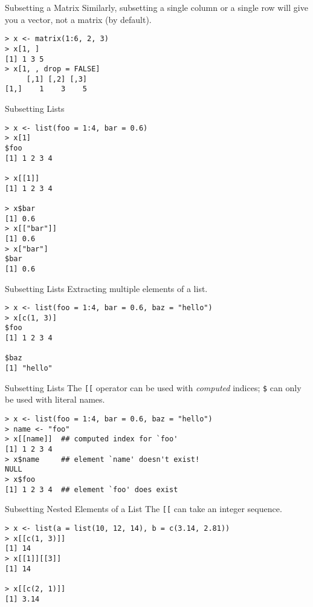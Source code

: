 \documentclass[aspectratio=169]{beamer}
\begin{document}
\begin{frame}[fragile]{Subsetting a Matrix}
Similarly, subsetting a single column or a single row will give you a
vector, not a matrix (by default).
\begin{verbatim}
> x <- matrix(1:6, 2, 3)
> x[1, ]
[1] 1 3 5
> x[1, , drop = FALSE]
     [,1] [,2] [,3]
[1,]    1    3    5
\end{verbatim}
\end{frame}

\begin{frame}[fragile]{Subsetting Lists}
\begin{verbatim}
> x <- list(foo = 1:4, bar = 0.6)
> x[1]
$foo
[1] 1 2 3 4

> x[[1]]
[1] 1 2 3 4

> x$bar
[1] 0.6
> x[["bar"]]
[1] 0.6
> x["bar"]
$bar
[1] 0.6
\end{verbatim}
\end{frame}

\begin{frame}[fragile]{Subsetting Lists}
Extracting multiple elements of a list.
\begin{verbatim}
> x <- list(foo = 1:4, bar = 0.6, baz = "hello")
> x[c(1, 3)]
$foo
[1] 1 2 3 4

$baz
[1] "hello"
\end{verbatim}
\end{frame}

\begin{frame}[fragile]{Subsetting Lists}
The \verb+[[+ operator can be used with \textit{computed} indices;
\verb+$+ can only be used with literal names.
\begin{verbatim}
> x <- list(foo = 1:4, bar = 0.6, baz = "hello")
> name <- "foo"
> x[[name]]  ## computed index for `foo'
[1] 1 2 3 4
> x$name     ## element `name' doesn't exist!
NULL
> x$foo
[1] 1 2 3 4  ## element `foo' does exist
\end{verbatim}
\end{frame}

\begin{frame}[fragile]{Subsetting Nested Elements of a List}
The \verb+[[+ can take an integer sequence.
\begin{verbatim}
> x <- list(a = list(10, 12, 14), b = c(3.14, 2.81))
> x[[c(1, 3)]]
[1] 14
> x[[1]][[3]]
[1] 14

> x[[c(2, 1)]]
[1] 3.14
\end{verbatim}
\end{frame}
\end{document}
